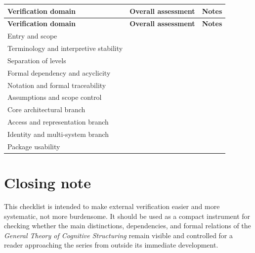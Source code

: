 \documentclass[11pt,a4paper]{article}
\begin{document}
	\begin{longtable}{>{\RaggedRight\arraybackslash}p{}
			>{\RaggedRight\arraybackslash}p{}
			>{\RaggedRight\arraybackslash}p{}}
		\toprule
		\textbf{Verification domain} & \textbf{Overall assessment} & \textbf{Notes} \\
		\midrule
		\endfirsthead
		\toprule
		\textbf{Verification domain} & \textbf{Overall assessment} & \textbf{Notes} \\
		\midrule
		\endhead
		
		Entry and scope & & \\
		
		Terminology and interpretive stability & & \\
		
		Separation of levels & & \\
		
		Formal dependency and acyclicity & & \\
		
		Notation and formal traceability & & \\
		
		Assumptions and scope control & & \\
		
		Core architectural branch & & \\
		
		Access and representation branch & & \\
		
		Identity and multi-system branch & & \\
		
		Package usability & & \\
		
		\bottomrule
	\end{longtable}
	
	\section{Closing note}
	
	This checklist is intended to make external verification easier and more systematic, not more burdensome. It should be used as a compact instrument for checking whether the main distinctions, dependencies, and formal relations of the \emph{General Theory of Cognitive Structuring} remain visible and controlled for a reader approaching the series from outside its immediate development.
\end{document}
